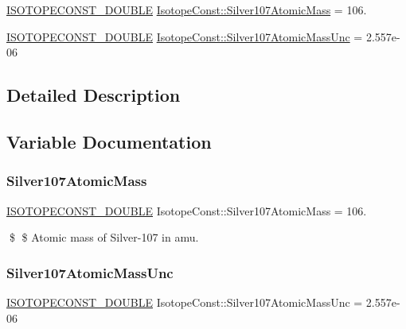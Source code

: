 \begin{DoxyCompactItemize}
\item 
\mbox{\hyperlink{group___isotope_const-_macros_ga8f45a7272ce02c0b4c65c44636ed719a}{I\+S\+O\+T\+O\+P\+E\+C\+O\+N\+S\+T\+\_\+\+D\+O\+U\+B\+LE}} \mbox{\hyperlink{group___isotope_const-_silver-_ag107_ga2707afb56bae9f2da134de443e32595a}{Isotope\+Const\+::\+Silver107\+Atomic\+Mass}} = 106.
\item 
\mbox{\hyperlink{group___isotope_const-_macros_ga8f45a7272ce02c0b4c65c44636ed719a}{I\+S\+O\+T\+O\+P\+E\+C\+O\+N\+S\+T\+\_\+\+D\+O\+U\+B\+LE}} \mbox{\hyperlink{group___isotope_const-_silver-_ag107_ga783b151f7393470fa48a39ee79c7561a}{Isotope\+Const\+::\+Silver107\+Atomic\+Mass\+Unc}} = 2.\+557e-\/06
\end{DoxyCompactItemize}


\subsection{Detailed Description}


\subsection{Variable Documentation}
\mbox{\label{group___isotope_const-_silver-_ag107_ga2707afb56bae9f2da134de443e32595a}} 
\subsubsection{\texorpdfstring{Silver107\+Atomic\+Mass}{Silver107AtomicMass}}
{\footnotesize\ttfamily \mbox{\hyperlink{group___isotope_const-_macros_ga8f45a7272ce02c0b4c65c44636ed719a}{I\+S\+O\+T\+O\+P\+E\+C\+O\+N\+S\+T\+\_\+\+D\+O\+U\+B\+LE}} Isotope\+Const\+::\+Silver107\+Atomic\+Mass = 106.}

\$ \$ Atomic mass of Silver-\/107 in amu. \mbox{\label{group___isotope_const-_silver-_ag107_ga783b151f7393470fa48a39ee79c7561a}} 
\subsubsection{\texorpdfstring{Silver107\+Atomic\+Mass\+Unc}{Silver107AtomicMassUnc}}
{\footnotesize\ttfamily \mbox{\hyperlink{group___isotope_const-_macros_ga8f45a7272ce02c0b4c65c44636ed719a}{I\+S\+O\+T\+O\+P\+E\+C\+O\+N\+S\+T\+\_\+\+D\+O\+U\+B\+LE}} Isotope\+Const\+::\+Silver107\+Atomic\+Mass\+Unc = 2.\+557e-\/06}

